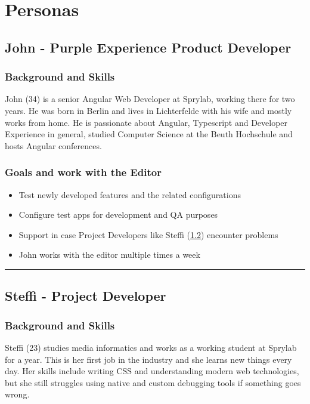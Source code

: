 
\chapter{Personas}
\label{app:personas}


\section{John - Purple Experience Product Developer}
\label{subsec:persona:productdev}
\subsection{Background and Skills}
John (34) is a senior Angular Web Developer at Sprylab, working there for two years. He was born in Berlin and lives in Lichterfelde with his wife and mostly works from home. He is passionate about Angular, Typescript and Developer Experience in general, studied Computer Science at the Beuth Hochschule and hosts Angular conferences.
\\
\subsection{Goals and work with the Editor}
\begin{itemize}[itemsep=0mm]
  \item Test newly developed features and the related configurations
  \item Configure test apps for development and QA purposes
  \item Support in case Project Developers like Steffi (\ref{subsec:persona:projectdev}) encounter problems
  \item John works with the editor multiple times a week
\end{itemize}

\hrule
\section{Steffi - Project Developer}
\label{subsec:persona:projectdev}
\subsection{Background and Skills}
Steffi (23) studies media informatics and works as a working student at Sprylab for a year. This is her first job in the industry and she learns new things every day. Her skills include writing CSS and understanding modern web technologies, but she still struggles using native and custom debugging tools if something goes wrong.  
\\
